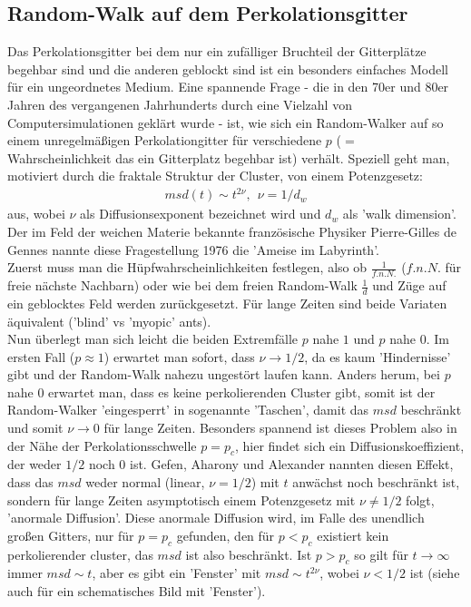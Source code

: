 \documentclass[a4paper, 12pt]{report}
\begin{document}
\subsection{Random-Walk auf dem Perkolationsgitter}
Das Perkolationsgitter bei dem nur ein zufälliger Bruchteil der Gitterplätze begehbar sind und die anderen geblockt sind ist ein besonders einfaches Modell für ein ungeordnetes Medium. Eine spannende Frage - die in den 70er und 80er Jahren des vergangenen Jahrhunderts durch eine Vielzahl von Computersimulationen geklärt wurde - ist, wie sich ein Random-Walker auf so einem unregelmäßigen Perkolationgitter für verschiedene $p$ ($=$ Wahrscheinlichkeit das ein Gitterplatz begehbar ist) verhält. Speziell geht man, motiviert durch die fraktale Struktur der Cluster, von einem Potenzgesetz:
\begin{align*}
msd(t) \sim t^{2 \nu},\ \ \nu=1/d_w
\end{align*} 
aus, wobei $\nu$ als Diffusionsexponent bezeichnet wird und $d_w$ als 'walk dimension'. Der im Feld der weichen Materie bekannte französische Physiker Pierre-Gilles de Gennes nannte diese Fragestellung 1976 die 'Ameise im Labyrinth'.\cite{Stauffer} 
\\ 
\noindent Zuerst muss man die Hüpfwahrscheinlichkeiten festlegen, also ob $\frac{1}{f.n.N.}$ ($f.n.N.$ für freie nächste Nachbarn) oder wie bei dem freien Random-Walk $\frac{1}{d}$ und Züge auf ein geblocktes Feld werden zurückgesetzt. Für lange Zeiten sind beide Variaten äquivalent ('blind' vs 'myopic' ants)\cite{Havlin}.
\\
Nun überlegt man sich leicht die beiden Extremfälle $p$ nahe $1$ und $p$ nahe $0$. Im ersten Fall ($p \approx 1$) erwartet man sofort, dass $\nu \rightarrow1/2$, da es kaum 'Hindernisse' gibt und der Random-Walk nahezu ungestört laufen kann. Anders herum, bei $p$ nahe $0$ erwartet man, dass es keine perkolierenden Cluster gibt, somit ist der Random-Walker 'eingesperrt' in sogenannte 'Taschen', damit das $msd$ beschränkt und somit $\nu \rightarrow 0$ für lange Zeiten. Besonders spannend ist dieses Problem also in der Nähe der Perkolationsschwelle $p=p_c$, hier findet sich ein Diffusionskoeffizient, der weder $1/2$ noch $0$ ist. Gefen, Aharony und Alexander nannten diesen Effekt, dass das $msd$ weder normal (linear, $\nu = 1/2$) mit $t$ anwächst noch beschränkt ist, sondern für lange Zeiten asymptotisch einem Potenzgesetz mit $\nu \neq 1/2$ folgt, 'anormale Diffusion'.\cite{PhysRevLett.50.77} Diese anormale Diffusion wird, im Falle des unendlich großen Gitters, nur für $p=p_c$ gefunden, den für $p<p_c$ existiert kein perkolierender cluster, das $msd$ ist also beschränkt. Ist $p > p_c$ so gilt für $t \rightarrow \infty $ immer $msd \sim t$, aber es gibt ein 'Fenster' mit $msd \sim t^{2\nu}$, wobei $\nu < 1/2$ ist (siehe auch \cite{Kammerer_2008} für ein schematisches Bild mit 'Fenster').
\end{document}
